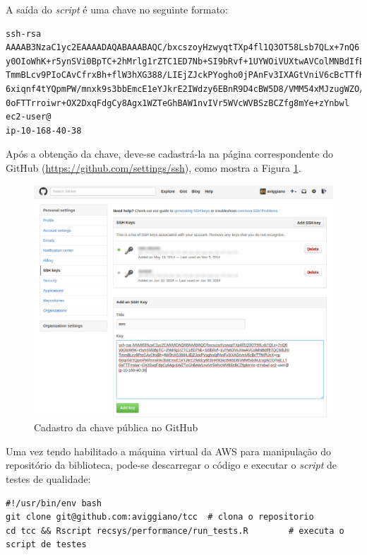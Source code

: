 A saída do \textit{script} é uma chave no seguinte formato:

\begin{lstlisting}
ssh-rsa AAAAB3NzaC1yc2EAAAADAQABAAABAQC/bxcszoyHzwyqtTXp4fl1Q3OT58Lsb7QLx+7nQ6
y0OIoWhK+r5ynSVi0BpTC+2hMrlg1rZTC1ED7Nb+SI9bRvf+1UYWOiVUXtwAVColMNBdIfE7QCWbJm
TmmBLcv9PIoCAvCfrxBh+flW3hXG388/LIEjZJckPYogho0jPAnFv3IXAGtVniV6cBcTTfKPUnX+np
6xiqnf4tYQpmPW/mnxk9s3bbEmcE1eYJkrE2IWdzy6EBnR9D4cBW5D8/VMM54xMJzugWZO//sIjLLT
0oFTTrroiwr+OX2DxqFdgCy8Agx1WZTeGhBAW1nvIVr5WVcWVBSzBCZfg8mYe+zYnbwl ec2-user@
ip-10-168-40-38
\end{lstlisting}

Após a obtenção da chave, deve-se cadastrá-la na página correspondente do GitHub (\url{https://github.com/settings/ssh}), como mostra a Figura \ref{fig:github_key}.

\begin{figure}[htp]
    \begin{center}
    \includegraphics[width=1\textwidth]{img/github_key}
    \end{center}
    \caption{Cadastro da chave pública no GitHub}
    \label{fig:github_key}
\end{figure}

Uma vez tendo habilitado a máquina virtual da AWS para manipulação do repositório da biblioteca, pode-se descarregar o código e executar o \textit{script} de testes de qualidade:

\begin{lstlisting}
#!/usr/bin/env bash
git clone git@github.com:aviggiano/tcc	# clona o repositorio
cd tcc && Rscript recsys/performance/run_tests.R 		# executa o script de testes
\end{lstlisting}